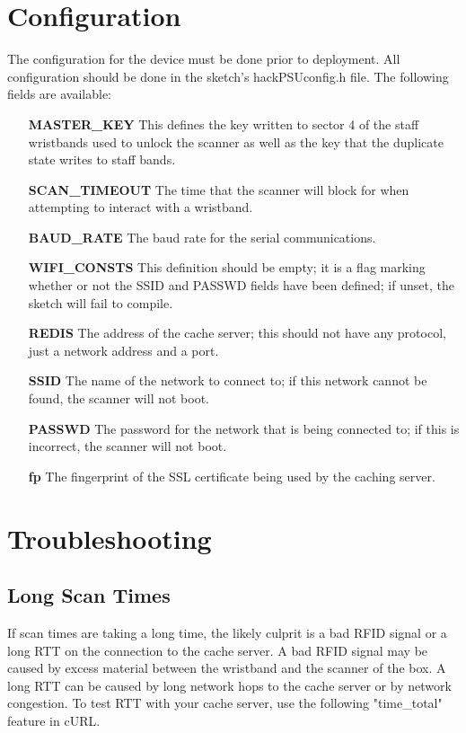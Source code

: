 \documentclass{article}
\begin{document}
\section{Configuration}
The configuration for the device must be done prior to deployment.  All configuration should be done in the sketch's hackPSUconfig.h file.  The following fields are available:
\begin{itemize}
	\item[\textbf{MASTER\_KEY}] This defines the key written to sector 4 of the staff wristbands used to unlock the scanner as well as the key that the duplicate state writes to staff bands.
	\item[\textbf{SCAN\_TIMEOUT}] The time that the scanner will block for when attempting to interact with a wristband.  
	\item[\textbf{BAUD\_RATE}] The baud rate for the serial communications.  
	\item[\textbf{WIFI\_CONSTS}] This definition should be empty; it is a flag marking whether or not the SSID and PASSWD fields have been defined; if unset, the sketch will fail to compile. 
	\item[\textbf{REDIS}] The address of the cache server; this should not have any protocol, just a network address and a port.
	\item[\textbf{SSID}] The name of the network to connect to; if this network cannot be found, the scanner will not boot.
	\item[\textbf{PASSWD}] The password for the network that is being connected to; if this is incorrect, the scanner will not boot.
	\item[\textbf{fp}] The fingerprint of the SSL certificate being used by the caching server.
\end{itemize}

\section{Troubleshooting}

\subsection{Long Scan Times}
If scan times are taking a long time, the likely culprit is a bad RFID signal or a long RTT on the connection to the cache server.  A bad RFID signal may be caused by excess material between the wristband and the scanner of the box.  A long RTT can be caused by long network hops to the cache server or by network congestion.  To test RTT with your cache server, use the following "time\_total" feature in cURL. 
\end{document}
